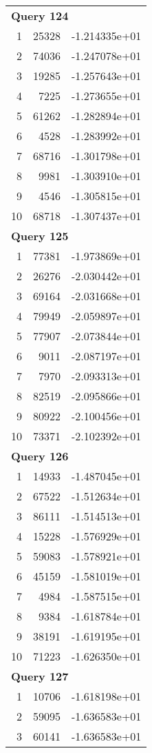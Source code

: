 \begin{longtable}[{p}]{@{}rrp{}@{}}
\midrule
\multicolumn{3}{l}{\bfseries Query 124} \\
1 & 25328 & -1.214335e+01 \\
2 & 74036 & -1.247078e+01 \\
3 & 19285 & -1.257643e+01 \\
4 & 7225 & -1.273655e+01 \\
5 & 61262 & -1.282894e+01 \\
6 & 4528 & -1.283992e+01 \\
7 & 68716 & -1.301798e+01 \\
8 & 9981 & -1.303910e+01 \\
9 & 4546 & -1.305815e+01 \\
10 & 68718 & -1.307437e+01 \\
\midrule
\multicolumn{3}{l}{\bfseries Query 125} \\
1 & 77381 & -1.973869e+01 \\
2 & 26276 & -2.030442e+01 \\
3 & 69164 & -2.031668e+01 \\
4 & 79949 & -2.059897e+01 \\
5 & 77907 & -2.073844e+01 \\
6 & 9011 & -2.087197e+01 \\
7 & 7970 & -2.093313e+01 \\
8 & 82519 & -2.095866e+01 \\
9 & 80922 & -2.100456e+01 \\
10 & 73371 & -2.102392e+01 \\
\midrule
\multicolumn{3}{l}{\bfseries Query 126} \\
1 & 14933 & -1.487045e+01 \\
2 & 67522 & -1.512634e+01 \\
3 & 86111 & -1.514513e+01 \\
4 & 15228 & -1.576929e+01 \\
5 & 59083 & -1.578921e+01 \\
6 & 45159 & -1.581019e+01 \\
7 & 4984 & -1.587515e+01 \\
8 & 9384 & -1.618784e+01 \\
9 & 38191 & -1.619195e+01 \\
10 & 71223 & -1.626350e+01 \\
\midrule
\multicolumn{3}{l}{\bfseries Query 127} \\
1 & 10706 & -1.618198e+01 \\
2 & 59095 & -1.636583e+01 \\
3 & 60141 & -1.636583e+01 \\

\end{longtable}
